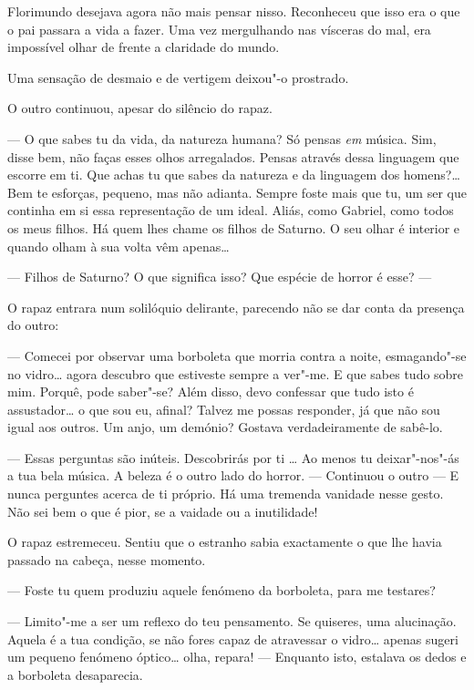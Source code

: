 Florimundo desejava agora não mais pensar nisso. Reconheceu que isso era
o que o pai passara a vida a fazer. Uma vez mergulhando nas vísceras do
mal, era impossível olhar de frente a claridade do mundo.

Uma sensação de desmaio e de vertigem deixou"-o prostrado.

O outro continuou, apesar do silêncio do rapaz.

--- O que sabes tu da vida, da natureza humana? Só pensas \emph{em}
música. Sim, disse bem, não faças esses olhos arregalados. Pensas
através dessa linguagem que escorre em ti. Que achas tu que sabes da
natureza e da linguagem dos homens?\ldots{} Bem te esforças, pequeno, mas não
adianta. Sempre foste mais que tu, um ser que continha em si essa
representação de um ideal. Aliás, como Gabriel, como todos os meus
filhos. Há quem lhes chame os filhos de Saturno. O seu olhar é interior
e quando olham à sua volta vêm apenas\ldots{}

--- Filhos de Saturno? O que significa isso? Que espécie de horror é esse?
--- 

O rapaz entrara num solilóquio delirante, parecendo não se dar conta da
presença do outro:

--- Comecei por observar uma borboleta que morria contra a noite,
esmagando"-se no vidro\ldots{} agora descubro que estiveste sempre a ver"-me. E
que sabes tudo sobre mim. Porquê, pode saber"-se? Além disso, devo
confessar que tudo isto é assustador\ldots{} o que sou eu, afinal? Talvez
me possas responder, já que não sou igual aos outros. Um anjo, um
demónio? Gostava verdadeiramente de sabê-lo.

--- Essas perguntas são inúteis. Descobrirás por ti \ldots{} Ao menos tu
deixar"-nos"-ás a tua bela música. A beleza é o outro lado do horror. ---
Continuou o outro --- E nunca perguntes acerca de ti próprio. Há uma
tremenda vanidade nesse gesto. Não sei bem o que é pior, se a vaidade ou
a inutilidade!

O rapaz estremeceu. Sentiu que o estranho sabia exactamente o que lhe
havia passado na cabeça, nesse momento.

--- Foste tu quem produziu aquele fenómeno da borboleta, para me testares?

--- Limito"-me a ser um reflexo do teu pensamento. Se quiseres, uma
alucinação. Aquela é a tua condição, se não fores capaz de atravessar o
vidro\ldots{} apenas sugeri um pequeno fenómeno óptico\ldots{} olha, repara! ---
Enquanto isto, estalava os dedos e a borboleta desaparecia.

